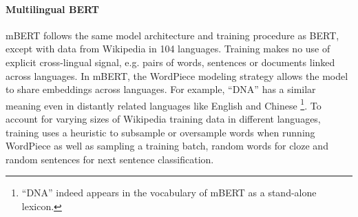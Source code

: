 \documentclass[11pt,a4paper]{article}
\begin{document}
\paragraph{Multilingual BERT} mBERT \cite{multilingualBERTmd} follows the same model architecture and training procedure as BERT, except with data from Wikipedia in 104 languages. Training makes no use of explicit cross-lingual signal, e.g. pairs of words, sentences or documents linked across languages.
In mBERT, the WordPiece modeling strategy allows the model to share embeddings across languages. For example, ``DNA'' has a similar meaning even in distantly related languages like English and Chinese \footnote{``DNA'' indeed appears in the vocabulary of mBERT as a stand-alone lexicon.}. To account for varying sizes of Wikipedia training data in different languages, training uses a heuristic to subsample or oversample words when running WordPiece as well as sampling a training batch, random words for cloze and random sentences for next sentence classification. 
\end{document}
